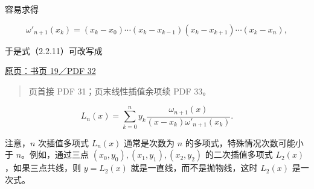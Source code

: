 \documentclass[
  10pt,
  fontset=fandol]{ctexart}
\begin{document}
容易求得

\[
\omega'_{n+1}(x_k)
=(x_k-x_0)\cdots(x_k-x_{k-1})(x_k-x_{k+1})\cdots(x_k-x_n),
\]

于是式（2.2.11）可改写成

\href{../../source-images/pdf-032.jpeg}{原页：书页 19／PDF 32}

\begin{quote}
页首接 PDF 31；页末线性插值余项续 PDF 33。
\end{quote}

\[
L_n(x)=\sum_{k=0}^{n}y_k
\frac{\omega_{n+1}(x)}
{(x-x_k)\omega'_{n+1}(x_k)}.
\tag{2.2.13}
\]

注意，\(n\) 次插值多项式 \(L_n(x)\) 通常是次数为 \(n\) 的多项式，特殊情况次数可能小于 \(n\)。例如，通过三点 \((x_0,\allowbreak y_0),\allowbreak (x_1,\allowbreak y_1),\allowbreak (x_2,\allowbreak y_2)\) 的二次插值多项式 \(L_2(x)\)，如果三点共线，则 \(y=L_2(x)\) 就是一直线，而不是抛物线，这时 \(L_2(x)\) 是一次式。
\end{document}
